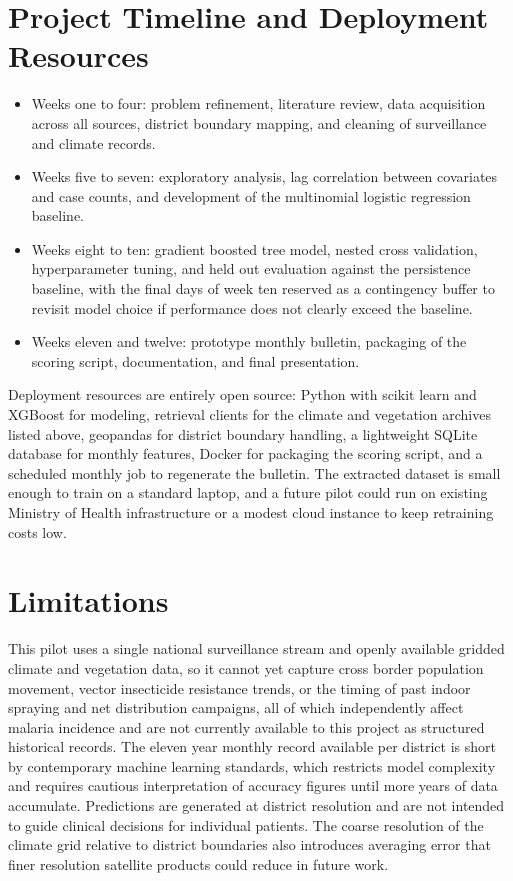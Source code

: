 \documentclass[11pt]{article}
\begin{document}
\section{Project Timeline and Deployment Resources}
\begin{itemize}
\item Weeks one to four: problem refinement, literature review, data acquisition across all sources, district boundary mapping, and cleaning of surveillance and climate records.
\item Weeks five to seven: exploratory analysis, lag correlation between covariates and case counts, and development of the multinomial logistic regression baseline.
\item Weeks eight to ten: gradient boosted tree model, nested cross validation, hyperparameter tuning, and held out evaluation against the persistence baseline, with the final days of week ten reserved as a contingency buffer to revisit model choice if performance does not clearly exceed the baseline.
\item Weeks eleven and twelve: prototype monthly bulletin, packaging of the scoring script, documentation, and final presentation.
\end{itemize}
Deployment resources are entirely open source: Python with scikit learn and XGBoost for modeling, retrieval clients for the climate and vegetation archives listed above, geopandas for district boundary handling, a lightweight SQLite database for monthly features, Docker for packaging the scoring script, and a scheduled monthly job to regenerate the bulletin. The extracted dataset is small enough to train on a standard laptop, and a future pilot could run on existing Ministry of Health infrastructure or a modest cloud instance to keep retraining costs low.

\section*{Limitations}
This pilot uses a single national surveillance stream and openly available gridded climate and vegetation data, so it cannot yet capture cross border population movement, vector insecticide resistance trends, or the timing of past indoor spraying and net distribution campaigns, all of which independently affect malaria incidence and are not currently available to this project as structured historical records. The eleven year monthly record available per district is short by contemporary machine learning standards, which restricts model complexity and requires cautious interpretation of accuracy figures until more years of data accumulate. Predictions are generated at district resolution and are not intended to guide clinical decisions for individual patients. The coarse resolution of the climate grid relative to district boundaries also introduces averaging error that finer resolution satellite products could reduce in future work.
\end{document}
